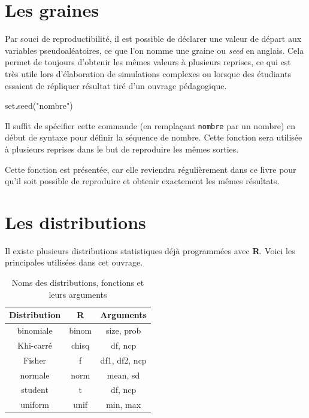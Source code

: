\documentclass[
]{book}
\newenvironment{Shaded}{}{}
\newcommand{\FunctionTok}[1]{#1}
\newcommand{\NormalTok}[1]{#1}
\newcommand{\StringTok}[1]{#1}
\begin{document}
\hypertarget{les-graines}{%
\section{Les graines}\label{les-graines}}

Par souci de reproductibilité, il est possible de déclarer une valeur de départ aux variables pseudoaléatoires, ce que l'on nomme une graine ou \emph{seed} en anglais. Cela permet de toujours d'obtenir les mêmes valeurs à plusieurs reprises, ce qui est très utile lors d'élaboration de simulations complexes ou lorsque des étudiants essaient de répliquer résultat tiré d'un ouvrage pédagogique.

\begin{Shaded}
\begin{Highlighting}[]
\FunctionTok{set.seed}\NormalTok{(}\StringTok{"nombre"}\NormalTok{)}
\end{Highlighting}
\end{Shaded}

Il suffit de spécifier cette commande (en remplaçant \texttt{nombre} par un nombre) en début de syntaxe pour définir la séquence de nombre. Cette fonction sera utilisée à plusieurs reprises dans le but de reproduire les mêmes sorties.

Cette fonction est présentée, car elle reviendra régulièrement dans ce livre pour qu'il soit possible de reproduire et obtenir exactement les mêmes résultats.

\hypertarget{les-distributions}{%
\section{Les distributions}\label{les-distributions}}

Il existe plusieurs distributions statistiques déjà programmées avec \textbf{R}. Voici les principales utilisées dans cet ouvrage.

\begin{table}[H]

\caption{\label{tab:unnamed-chunk-42}Noms des distributions, fonctions et leurs arguments}
\centering
\begin{tabular}[t]{ccc}
\toprule
Distribution & R & Arguments\\
\midrule
binomiale & binom & size, prob\\
Khi-carré & chisq & df, ncp\\
Fisher & f & df1, df2, ncp\\
normale & norm & mean, sd\\
student & t & df, ncp\\
\addlinespace
uniform & unif & min, max\\
\bottomrule
\end{tabular}
\end{table}
\end{document}
